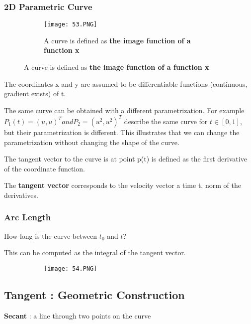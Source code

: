 \documentclass{article}
\begin{document}
\subsubsection{2D Parametric Curve}

    \begin{figure}[ht!]
  \centering
  \begin{subfigure}[b]{0.7\linewidth}
    \texttt{[image: 53.PNG]}
    \caption{A curve is defined as \textbf{the image function of a function x}}
  \end{subfigure}
\end{figure}

The coordinates x and y are assumed to be differentiable functions (continuous, gradient exists) of t.

The same curve can be obtained with a different parametrization. For example $P_1(t) = (u,u)^T and P_2 = (u^2,u^2)^T$ describe the same curve for $t \in [0,1]$, but their parametrization is different. This illustrates that we can change the parametrization without changing the shape of the curve.

The tangent vector to the curve is at point p(t) is defined as the first derivative of the coordinate function.

The \textbf{tangent vector} corresponds to the velocity vector a time t, norm of the derivatives.


\subsubsection{Arc Length}

How long is the curve between $t_0$ and $t$? 

This can be computed as the integral of the tangent vector.


    \begin{figure}[ht!]
  \centering
  \begin{subfigure}[b]{0.7\linewidth}
    \texttt{[image: 54.PNG]}
  \end{subfigure}
\end{figure}

\vspace{30mm}

\subsection{Tangent : Geometric Construction}

\textbf{Secant} : a line through two points on the curve
\end{document}
